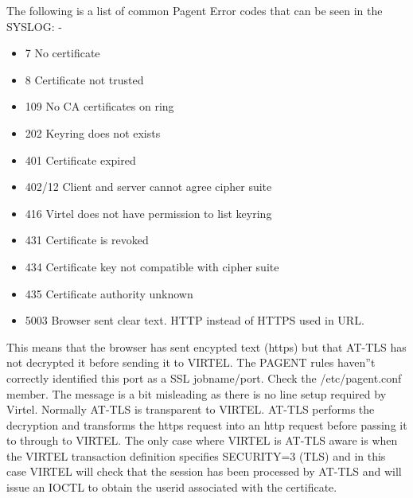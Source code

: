 \documentclass[letterpaper,10pt,english]{sphinxmanual}
\begin{document}
The following is a list of common Pagent Error codes that can be seen in the SYSLOG: -
\begin{itemize}
\item {} 
7      No certificate

\item {} 
8      Certificate not trusted

\item {} 
109    No CA certificates on ring

\item {} 
202    Keyring does not exists

\item {} 
401    Certificate expired

\item {} 
402/12 Client and server cannot agree cipher suite

\item {} 
416    Virtel does not have permission to list keyring

\item {} 
431    Certificate is revoked

\item {} 
434    Certificate key not compatible with cipher suite

\item {} 
435    Certificate authority unknown

\item {} 
5003   Browser sent clear text. HTTP instead of HTTPS used in URL.

\end{itemize}



This means that the browser has sent encypted text (https) but that AT-TLS has not decrypted it before sending it to VIRTEL. The PAGENT rules haven”t correctly identified this port as a SSL jobname/port. Check the /etc/pagent.conf member. The message is a bit misleading as there is no line setup required by Virtel.  Normally AT-TLS is transparent to VIRTEL. AT-TLS performs the decryption and transforms the https request into an http request before passing it to through to VIRTEL. The only case where VIRTEL is AT-TLS aware is when the VIRTEL transaction definition specifies SECURITY=3 (TLS) and in this case VIRTEL will check that the session has been processed by AT-TLS and will issue an IOCTL to obtain the userid associated with the certificate.
\end{document}
